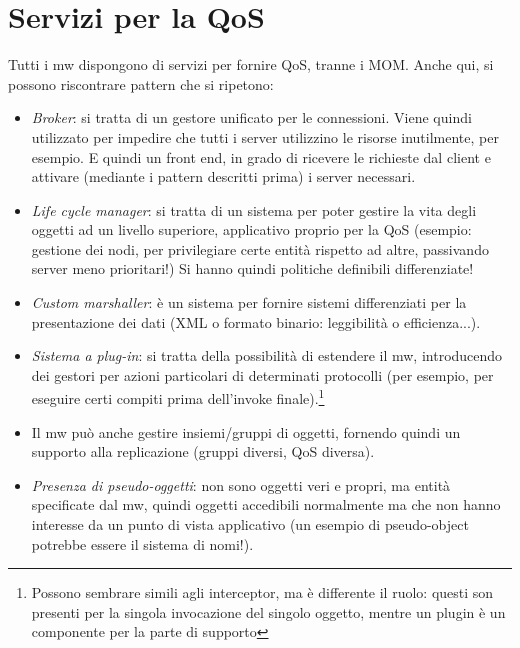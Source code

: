 \section{Servizi per la QoS}
Tutti i mw dispongono di servizi per fornire QoS, tranne i MOM. Anche qui, si possono riscontrare pattern che si
ripetono:
\begin{itemize}
 \item \textit{Broker}: si tratta di un gestore unificato per le connessioni. Viene quindi utilizzato per impedire
 che tutti i server utilizzino le risorse inutilmente, per esempio. E quindi un front end, in grado di ricevere le
 richieste dal client e attivare (mediante i pattern descritti prima) i server necessari.
 \item \textit{Life cycle manager}: si tratta di un sistema per poter gestire la vita degli oggetti ad un livello
 superiore, applicativo proprio per la QoS (esempio: gestione dei nodi, per privilegiare certe entità rispetto ad
 altre, passivando server meno prioritari!) Si hanno quindi politiche definibili differenziate!
 \item \textit{Custom marshaller}: è un sistema per fornire sistemi differenziati per la presentazione dei dati (XML
 o formato binario: leggibilità o efficienza...).
 \item \textit{Sistema a plug-in}: si tratta della possibilità di estendere il mw, introducendo dei gestori per azioni
 particolari di determinati protocolli (per esempio, per eseguire certi compiti prima dell'invoke
 finale).\footnote{Possono sembrare simili agli interceptor, ma è differente il ruolo: questi son presenti per la
 singola invocazione del singolo oggetto, mentre un plugin è un componente per la parte di supporto}
 \item Il mw può anche gestire insiemi/gruppi di oggetti, fornendo quindi un supporto alla replicazione (gruppi
 diversi, QoS diversa).
 \item \textit{Presenza di pseudo-oggetti}: non sono oggetti veri e propri, ma entità specificate dal mw, quindi
 oggetti accedibili normalmente ma che non hanno interesse da un punto di vista applicativo (un esempio di
 pseudo-object potrebbe essere il sistema di nomi!).
\end{itemize}